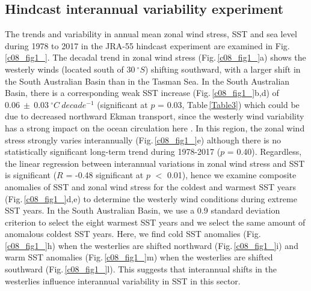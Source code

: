 \documentclass[draft,linenumbers]{agujournal2018}
\begin{document}
\subsection{Hindcast interannual variability experiment}
The trends and variability in annual mean zonal wind stress, SST and sea level during 1978 to 2017 in the JRA-55 hindcast experiment are examined in Fig.\,\ref{c08_fig1_}. The decadal trend in zonal wind stress (Fig.\,\ref{c08_fig1_}a) shows the westerly winds (located south of $30\ ^{\circ}S$) shifting southward, with a larger shift in the South Australian Basin than in the Tasman Sea. In the South Australian Basin, there is a corresponding weak SST increase (Fig.\,\ref{c08_fig1_}b,d) of $0.06\ \pm\ 0.03\ ^{\circ}C\ decade^{-1}$ (significant at $p$ = 0.03, Table\,\ref{Table3}) which could be due to decreased northward Ekman transport, since the westerly wind variability has a strong impact on the ocean circulation here \citep{Middleton2007}. In this region, the zonal wind stress strongly varies interannually (Fig.\,\ref{c08_fig1_}e) although there is no statistically significant long-term trend during 1978-2017 ($p$ = 0.40). Regardless, the linear regression between interannual variations in zonal wind stress and SST is significant ($R$ = -0.48 significant at $p$ $<$ 0.01), hence we examine composite anomalies of SST and zonal wind stress for the coldest and warmest SST years (Fig.\,\ref{c08_fig1_}d,e) to determine the westerly wind conditions during extreme SST years. In the South Australian Basin, we use a 0.9 standard deviation criterion to select the eight warmest SST years and we select the same amount of anomalous coldest SST years. Here, we find cold SST anomalies (Fig.\,\ref{c08_fig1_}h) when the westerlies are shifted northward (Fig.\,\ref{c08_fig1_}i) and warm SST anomalies (Fig.\,\ref{c08_fig1_}m) when the westerlies are shifted southward (Fig.\,\ref{c08_fig1_}l). This suggests that interannual shifts in the westerlies influence interannual variability in SST in this sector.
\end{document}
